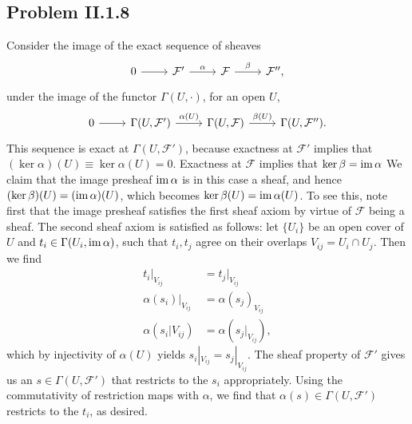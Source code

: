 \documentclass{mathnotes}
\begin{document}
\subsection*{Problem II.1.8}
Consider the image of the exact sequence of sheaves
\begin{equation*}
    \begin{tikzcd}
        0\ar{r} & \mathcal{F}'\ar{r}{\alpha} & \mathcal{F}\ar{r}{\beta} & \mathcal{F}'',
    \end{tikzcd}
\end{equation*}
under the image of the functor $\Gamma(U,\cdot)$, for an open $U$,
\begin{equation*}
    \begin{tikzcd}
        0\ar{r} & \Gamma(U,\mathcal{F}')\ar{r}{\alpha(U)} & \Gamma(U,\mathcal{F})\ar{r}{\beta(U)} & \Gamma(U,\mathcal{F}'').
    \end{tikzcd}
\end{equation*}
This sequence is exact at $\Gamma(U,\mathcal{F}')$, because exactness at $\mathcal{F}'$ implies that $(\ker\alpha)(U)\equiv\ker\alpha(U)=0$.
Exactness at $\mathcal{F}$ implies that $\ker\beta=\operatorname{im}\alpha$ 
We claim that the image presheaf $\operatorname{im}\alpha$ is in this case a sheaf, and hence $(\ker\beta)(U)=(\operatorname{im}\alpha)(U)$,
which becomes $\ker\beta(U)=\operatorname{im}\alpha(U)$.  
To see this, note first that the image presheaf satisfies the first sheaf axiom by virtue of $\mathcal{F}$ being a sheaf.
The second sheaf axiom is satisfied as follows: let $\{U_i\}$ be an open cover of $U$ and $t_i\in\Gamma(U_i,\mathcal{\operatorname{im}\alpha})$,
such that $t_i,t_j$ agree on their overlaps $V_{ij}=U_i\cap U_j$. Then we find
\begin{align*}
    t_i|_{V_{ij}} &= t_j|_{V_{ij}}\\
    \alpha(s_i)|_{V_{ij}} &= \alpha(s_j)_{V_{ij}}\\
    \alpha(s_i|{V_{ij}}) &= \alpha(s_j|_{V_{ij}}),
\end{align*}
which by injectivity of $\alpha(U)$ yields $s_i|_{V_{ij}}=s_j|_{V_{ij}}$. The sheaf property of $\mathcal{F}'$
gives us an $s\in\Gamma(U,\mathcal{F}')$ that restricts to the $s_i$ appropriately. Using the commutativity
of restriction maps with $\alpha$, we find that $\alpha(s)\in\Gamma(U,\mathcal{F}')$ restricts to the $t_i$,
as desired.
\end{document}

